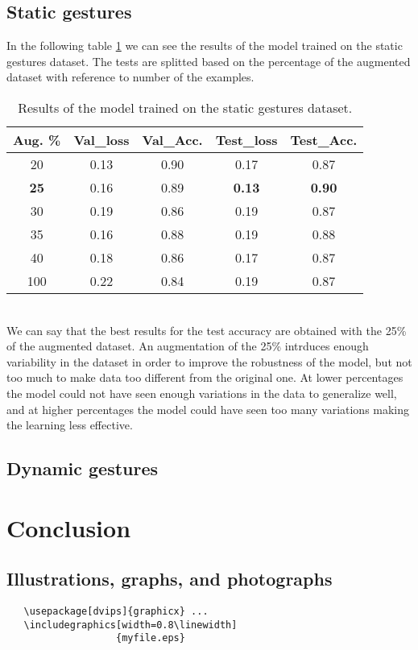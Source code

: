 \documentclass[10pt,twocolumn,letterpaper]{article}
\begin{document}
\subsection{Static gestures}
In the following table \ref{tab:staticGestures} we can see the results of the model 
trained on the static gestures dataset. 
The tests are splitted based on the percentage of the augmented dataset with reference to number of the examples.
\begin{table}[h]
   \begin{center}
   \begin{tabular}{|c|c|c|c|c|}
   \hline
   \textbf{Aug. \%} & \textbf{Val\_loss} & \textbf{Val\_Acc.} & \textbf{Test\_loss} & \textbf{Test\_Acc.}\\
   \hline\hline
   20 & 0.13 & 0.90 & 0.17 & 0.87 \\
   \textbf{25} & 0.16 & 0.89 & \textbf{0.13} & \textbf{0.90} \\
   30 & 0.19 & 0.86 & 0.19 & 0.87 \\
   35 & 0.16 & 0.88 & 0.19 & 0.88 \\
   40 & 0.18 & 0.86 & 0.17 & 0.87 \\
   100 & 0.22 & 0.84 & 0.19 & 0.87 \\ 
   \hline
   \end{tabular}
   \end{center}
   \caption{Results of the model trained on the static gestures dataset.}
   \label{tab:staticGestures}
\end{table} \\
We can say that the best results for the test accuracy are obtained with the 25\% of the 
augmented dataset. An augmentation of the 25\% intrduces enough variability in the dataset in order to 
improve the robustness of the model, but not too much to make data too different from the original one.
At lower percentages the model could not have seen enough variations in the data to generalize well, and at 
higher percentages the model could have seen too many variations making the learning less effective.
\subsection{Dynamic gestures}
\section{Conclusion}






\subsection{Illustrations, graphs, and photographs}

{\small\begin{verbatim}
   \usepackage[dvips]{graphicx} ...
   \includegraphics[width=0.8\linewidth]
                   {myfile.eps}
\end{verbatim}
}


{\small


}
\end{document}
